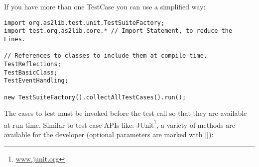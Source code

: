 If you have more than one TestCase you can use a simplified way:
\begin{lstlisting}[frame=single]
import org.as2lib.test.unit.TestSuiteFactory;
import test.org.as2lib.core.* // Import Statement, to reduce the Lines.

// References to classes to include them at compile-time.
TestReflections;
TestBasicClass;
TestEventHandling;

new TestSuiteFactory().collectAllTestCases().run();
\end{lstlisting}


The cases to test must be invoked before the test call so that they are available at run-time.
Similar to test case APIs like: JUnit\footnote{\href{http://www.junit.org}{www.junit.org}}, a variety of methods are available for the developer (optional parameters are marked with []):

